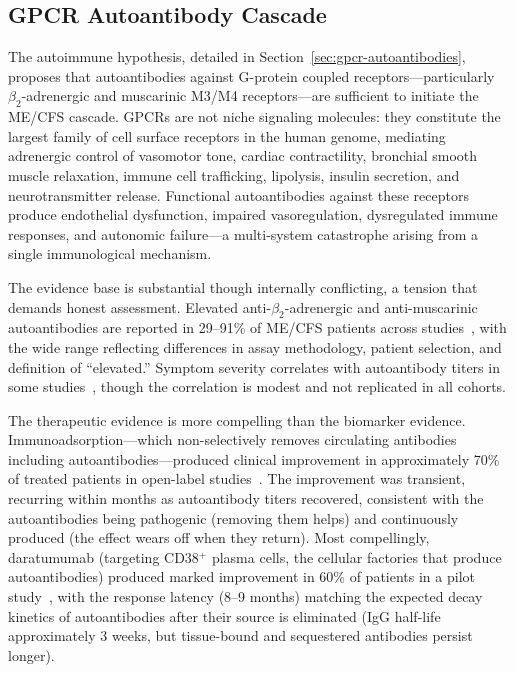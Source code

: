 \subsection{GPCR Autoantibody Cascade}
\label{sec:root-gpcr}

The autoimmune hypothesis, detailed in Section~\ref{sec:gpcr-autoantibodies}, proposes that autoantibodies against G-protein coupled receptors---particularly $\beta_2$-adrenergic and muscarinic M3/M4 receptors---are sufficient to initiate the ME/CFS cascade. GPCRs are not niche signaling molecules: they constitute the largest family of cell surface receptors in the human genome, mediating adrenergic control of vasomotor tone, cardiac contractility, bronchial smooth muscle relaxation, immune cell trafficking, lipolysis, insulin secretion, and neurotransmitter release. Functional autoantibodies against these receptors produce endothelial dysfunction, impaired vasoregulation, dysregulated immune responses, and autonomic failure---a multi-system catastrophe arising from a single immunological mechanism.

The evidence base is substantial though internally conflicting, a tension that demands honest assessment. Elevated anti-$\beta_2$-adrenergic and anti-muscarinic autoantibodies are reported in 29--91\% of ME/CFS patients across studies~\cite{Loebel2016, Bynke2020}, with the wide range reflecting differences in assay methodology, patient selection, and definition of ``elevated.'' Symptom severity correlates with autoantibody titers in some studies~\cite{Sotzny2021}, though the correlation is modest and not replicated in all cohorts.

The therapeutic evidence is more compelling than the biomarker evidence. Immunoadsorption---which non-selectively removes circulating antibodies including autoantibodies---produced clinical improvement in approximately 70\% of treated patients in open-label studies~\cite{Stein2024immunoadsorption}. The improvement was transient, recurring within months as autoantibody titers recovered, consistent with the autoantibodies being pathogenic (removing them helps) and continuously produced (the effect wears off when they return). Most compellingly, daratumumab (targeting CD38$^+$ plasma cells, the cellular factories that produce autoantibodies) produced marked improvement in 60\% of patients in a pilot study~\cite{Fluge2025daratumumab}, with the response latency (8--9 months) matching the expected decay kinetics of autoantibodies after their source is eliminated (IgG half-life approximately 3 weeks, but tissue-bound and sequestered antibodies persist longer).

